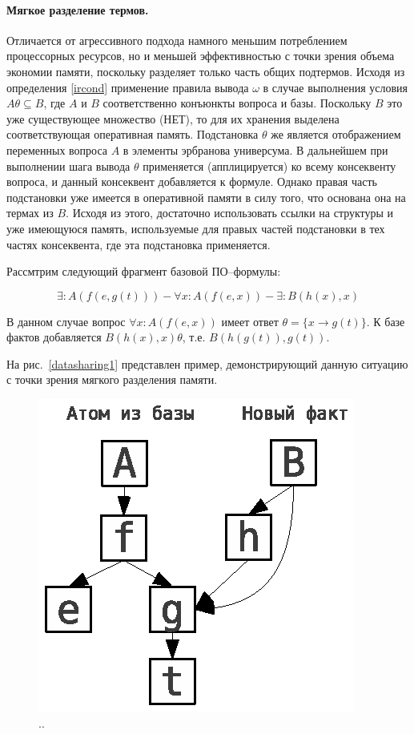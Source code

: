 \paragraph{Мягкое разделение термов.} Отличается от агрессивного подхода намного меньшим потреблением процессорных ресурсов, но и меньшей эффективностью с точки зрения объема экономии памяти,
поскольку разделяет только часть общих подтермов. Исходя из определения \ref{ircond} применение правила вывода $\omega$  в случае выполнения условия $A\theta \subseteq B$, где $A$ и $B$ соответственно конъюнкты вопроса и базы. Поскольку $B$ это уже существующее множество  (НЕТ), то для их хранения выделена соответствующая оперативная память. Подстановка $\theta$ же является отображением переменных вопроса $A$ в элементы эрбранова универсума. В дальнейшем при выполнении шага вывода $\theta$ применяется (апплицируется) ко всему консеквенту вопроса, и данный консеквент добавляется к формуле. Однако правая часть подстановки уже имеется в оперативной памяти в силу того, что основана она на термах из $B$. Исходя из этого, достаточно использовать ссылки на структуры и уже имеющуюся память, используемые для правых частей подстановки в тех частях консеквента, где эта подстановка применяется. 

Рассмтрим следующий фрагмент базовой ПО--формулы:

$$ \exists:A(f(e,g(t))) - \forall x:A(f(e,x)) - \exists:B(h(x),x) $$

В данном случае вопрос $\forall x:A(f(e,x))$ имеет ответ $\theta = \{x \rightarrow g(t)\}$. К базе фактов добавляется $B(h(x),x)\theta$, т.е. $B(h(g(t)),g(t))$. 

На рис.~\ref{datasharing1} представлен пример, демонстрирующий данную ситуацию с точки зрения мягкого разделения памяти.

\begin{figure}[h]
	\centering
	\includegraphics[width=0.3\linewidth]{pics/DataSharing1.eps}
	\caption{..}
	\label{fig:datasharing1}
\end{figure}

